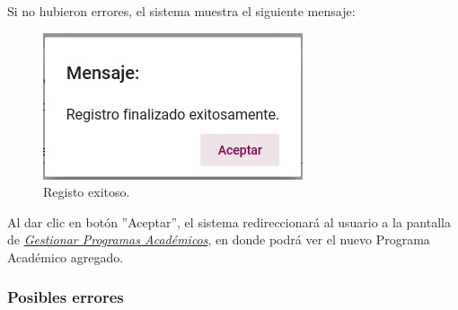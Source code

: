         Si no hubieron errores, el sistema muestra el siguiente mensaje:

        \begin{figure}[H]
            \centering
            \hypertarget{exito}{\includegraphics[width=0.7\linewidth]{images/SP3/Exitoso}}
            \caption{Registo exitoso.}
            \label{exito}
        \end{figure}

        Al dar clic en botón ''Aceptar'', el sistema redireccionará al usuario a la pantalla de \hyperlink{consultarpa}{\textit{Gestionar Programas Académicos}}, en donde podrá ver el nuevo Programa Académico agregado.\\


        \subsubsection{Posibles errores}

